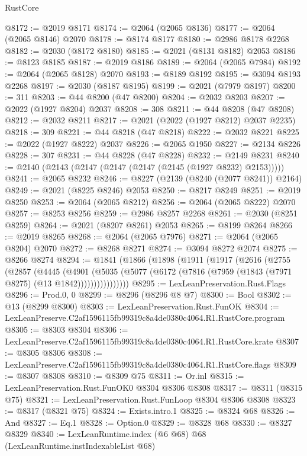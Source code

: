 \begin{lexlean}{RustCore}
\begin{coremodule}
@8172 := @2019 @8171
@8174 := @2064 (@2065 @8136)
@8177 := @2064 (@2065 @8146) @2070
@8178 := @8174 @8177
@8180 := @2986 @8178 @2268
@8182 := @2030 (@8172 @8180)
@8185 := @2021 (@8131 @8182) @2053
@8186 := @8123 @8185
@8187 := @2019 @8186
@8189 := @2064 (@2065 @7984)
@8192 := @2064 (@2065 @8128) @2070
@8193 := @8189 @8192
@8195 := @3094 @8193 @2268
@8197 := @2030 (@8187 @8195)
@8199 := @2021 (@7979 @8197)
@8200 := 311
@8203 := @44 @8200 (@47 @8200)
@8204 := @2032 @8203
@8207 := @2022 (@1927 @8204) @2037
@8208 := 308
@8211 := @44 @8208 (@47 @8208)
@8212 := @2032 @8211
@8217 := @2021 (@2022 (@1927 @8212) @2037 @2235)
@8218 := 309
@8221 := @44 @8218 (@47 @8218)
@8222 := @2032 @8221
@8225 := @2022 (@1927 @8222) @2037
@8226 := @2065 @1950
@8227 := @2134 @8226
@8228 := 307
@8231 := @44 @8228 (@47 @8228)
@8232 := @2149 @8231
@8240 := @2140 (@2143 (@2147 (@2147 (@2147 (@2145 (@1927 @8232) @2153)))))
@8241 := @2065 @8232
@8246 := @8227 (@2139 (@8240 (@2077 @8241)) @2164)
@8249 := @2021 (@8225 @8246) @2053
@8250 := @8217 @8249
@8251 := @2019 @8250
@8253 := @2064 (@2065 @8212)
@8256 := @2064 (@2065 @8222) @2070
@8257 := @8253 @8256
@8259 := @2986 @8257 @2268
@8261 := @2030 (@8251 @8259)
@8264 := @2021 (@8207 @8261) @2053
@8265 := @8199 @8264
@8266 := @2019 @8265
@8268 := @2064 (@2065 @7976)
@8271 := @2064 (@2065 @8204) @2070
@8272 := @8268 @8271
@8274 := @3094 @8272 @2074
@8275 := @8266 @8274
@8294 := @1841
    (@1866
      (@1898
        (@1911
          (@1917
            (@2616
              (@2755
                (@2857
                  (@4445
                    (@4901
                      (@5035
                        (@5077 (@6172 (@7816 (@7959 (@1843 (@7971 @8275) (@13 @1842))))))))))))))))
@8295 := LexLeanPreservation.Rust.Flags
@8296 := Prod.{0, 0}
@8299 := @8296 (@8296 @8 @7)
@8300 := Bool
@8302 := @13 (@8299 @8300)
@8303 := LexLeanPreservation.Rust.FunOK
@8304 := LexLeanPreserve.C2af1596115fb99319c8a4de0380c4064.R1.RustCore.program
@8305 := @8303 @8304
@8306 := LexLeanPreserve.C2af1596115fb99319c8a4de0380c4064.R1.RustCore.krate
@8307 := @8305 @8306
@8308 := LexLeanPreserve.C2af1596115fb99319c8a4de0380c4064.R1.RustCore.flags
@8309 := @8307 @8308
@8310 := @8309 @75
@8311 := Or.inl
@8315 := LexLeanPreservation.Rust.FunOK0 @8304 @8306 @8308
@8317 := @8311 (@8315 @75)
@8321 := LexLeanPreservation.Rust.FunLoop @8304 @8306 @8308
@8323 := @8317 (@8321 @75)
@8324 := Exists.intro.{1}
@8325 := @8324 @68
@8326 := And
@8327 := Eq.{1}
@8328 := Option.{0}
@8329 := @8328 @68
@8330 := @8327 @8329
@8340 := LexLeanRuntime.index
    (@6 @68)
    @68
    (LexLeanRuntime.instIndexableList @68)

\end{coremodule}
\end{lexlean}
